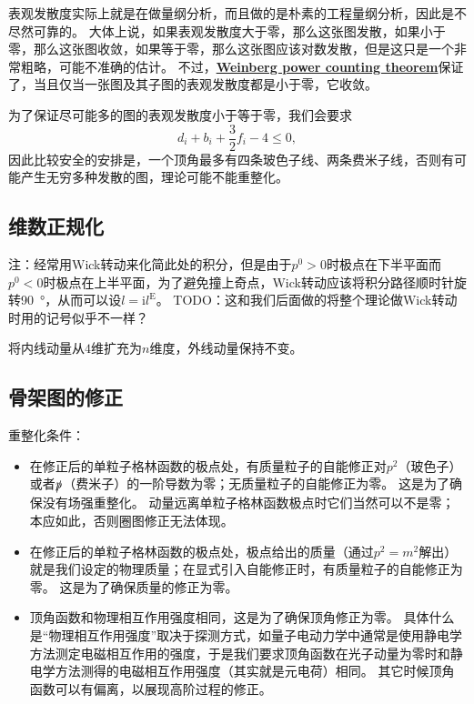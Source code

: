 \documentclass[hyperref, UTF8, a4paper]{ctexart}
\newcommand*{\ii}{\mathrm{i}}
\newcommand{\concept}[1]{\underline{\textbf{#1}}}
\begin{document}
表观发散度实际上就是在做量纲分析，而且做的是朴素的工程量纲分析，因此是不尽然可靠的。
大体上说，如果表观发散度大于零，那么这张图发散，如果小于零，那么这张图收敛，如果等于零，那么这张图应该对数发散，但是这只是一个非常粗略，可能不准确的估计。
不过，\concept{Weinberg power counting theorem}保证了，当且仅当一张图及其子图的表观发散度都是小于零，它收敛。

为了保证尽可能多的图的表观发散度小于等于零，我们会要求
\begin{equation}
    d_i + b_i + \frac{3}{2} f_i - 4 \leq 0,
\end{equation}
因此比较安全的安排是，一个顶角最多有四条玻色子线、两条费米子线，否则有可能产生无穷多种发散的图，理论可能不能重整化。

\subsection{维数正规化}

注：经常用Wick转动来化简此处的积分，但是由于$p^0 > 0$时极点在下半平面而$p^0 < 0$时极点在上半平面，为了避免撞上奇点，Wick转动应该将积分路径顺时针旋转\SI{90}{\degree}，从而可以设$l = \ii l^\text{E}$。
TODO：这和我们后面做的将整个理论做Wick转动时用的记号似乎不一样？

将内线动量从$4$维扩充为$n$维度，外线动量保持不变。

\subsection{骨架图的修正}

重整化条件：
\begin{itemize}
    \item 在修正后的单粒子格林函数的极点处，有质量粒子的自能修正对$p^2$（玻色子）或者$\slashed{p}$（费米子）的一阶导数为零；无质量粒子的自能修正为零。
    这是为了确保没有场强重整化。
    动量远离单粒子格林函数极点时它们当然可以不是零；本应如此，否则圈图修正无法体现。
    \item 在修正后的单粒子格林函数的极点处，极点给出的质量（通过$p^2=m^2$解出）就是我们设定的物理质量；在显式引入自能修正时，有质量粒子的自能修正为零。
    这是为了确保质量的修正为零。
    \item 顶角函数和物理相互作用强度相同，这是为了确保顶角修正为零。
    具体什么是“物理相互作用强度”取决于探测方式，如量子电动力学中通常是使用静电学方法测定电磁相互作用的强度，于是我们要求顶角函数在光子动量为零时和静电学方法测得的电磁相互作用强度（其实就是元电荷）相同。
    其它时候顶角函数可以有偏离，以展现高阶过程的修正。
\end{itemize}
\end{document}
